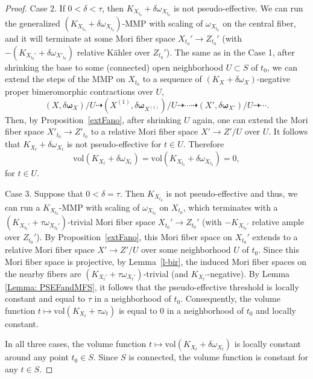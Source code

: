 \documentclass[12pt]{amsart}
\numberwithin{equation}{section}
\theoremstyle{definition}
\theoremstyle{plain}
\newtheorem*{thm A*}{Theorem A}
\newtheorem*{thm B*}{Theorem B}
\newtheorem*{thm C*}{Theorem C}
\newtheorem*{thm D*}{Theorem D}
\theoremstyle{definition}
\renewcommand{\1}{\mathds{1}}
\newcommand{\vol}{\mathrm{vol}}
\renewcommand{\>}{\rightarrow}
\begin{document}
\begin{proof}
Case 2. If $0 < \delta < \tau$, then $K_{X_{t_0}}+\delta \omega_{X_{t_0}}$ is not pseudo-effective. We can run the generalized $(K_{X_{t_0}} + \delta {\omega}_{X_{t_0}})$-MMP with scaling of $\omega_{X_{t_0}}$ on the central fiber, and it will terminate at some Mori fiber space $X_{t_0}' \to Z_{t_0}'$ (with $-(K_{X_{t_0}'}+\delta \omega_{X'_{t_0}})$ relative K\"ahler over $Z_{t_0}'$). The same as in the Case 1, after shrinking the base to some (connected) open neighborhood $U \subset S$ of ${t_0}$, we can extend the steps of the MMP on $X_{t_0}$ to a sequence of $(K_X+ \delta{\omega}_X)$-negative proper bimeromorphic contractions over $U$, $$(X , \delta \boldsymbol{\omega}_X)/U \dashrightarrow (X^{(1)},\delta \boldsymbol{\omega}_{X^{(1)}})/U \dashrightarrow \cdots \dashrightarrow (X', \delta \boldsymbol{\omega}_{X'})/U\dashrightarrow \cdots.$$Then, by Proposition~\ref{extFano}, after shrinking $U$ again, one can extend the Mori fiber space $X'_{t_0} \to Z'_{t_0}$ to a relative Mori fiber space $X' \to Z'/U$ over $U$. It follows that $K_{X_t} + \delta \omega_{X_t}$ is not pseudo-effective for $t \in U$. Therefore
$$
\vol(K_{X_t} + \delta \omega_{X_t}) = \vol(K_{X_{t_0}} + \delta \omega_{X_{t_0}}) = 0,
$$
for $t \in U$.

Case 3. Suppose that $0<\delta = \tau$. Then $K_{X_{t_0}}$ is not pseudo-effective and thus, we can run a $K_{X_{t_0}}$-MMP with scaling of $\omega_{X_{t_0}}$ on $X_{t_0}$, which terminates with a $(K_{X_{t_0}'} + \tau \omega_{X_{t_0}'})$-trivial Mori fiber space $X_{t_0}' \to Z_{t_0}'$ (with $-K_{X_{t_0}'}$ relative ample over $Z_{t_0}'$). By Proposition~\ref{extFano}, this Mori fiber space on $X_{t_0}'$ extends to a relative Mori fiber space $X' \to Z'/U$ over some neighborhood $U$ of $t_0$. Since this Mori fiber space is projective, by Lemma~\ref{l-bir}, the induced Mori fiber spaces on the nearby fibers are $(K_{X_t'}+\tau \omega_{X_t'})$-trivial (and $K_{X_t'}$-negative). By Lemma \ref{Lemma: PSEFandMFS}, it follows that the pseudo-effective threshold is locally constant and equal to $\tau$ in a neighborhood of $t_0$. Consequently, the volume function $t \longmapsto \vol(K_{X_t} + \tau \omega_t)$ is equal to $0$ in a neighborhood of $t_0$ and locally constant.


In all three cases, the volume function $t\longmapsto \vol(K_{X_t} + \delta {\omega}_{X_t})$ is locally constant around any point $t_0 \in S$. Since $S$ is connected, the volume function is constant for any $t\in S$. 
\end{proof}
\end{document}
